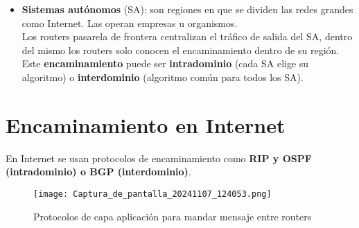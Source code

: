 \documentclass{article}
\begin{document}
\begin{itemize}
    \item \textbf{Sistemas autónomos} (SA): son regiones en que se dividen las redes grandes como Internet. Las operan empresas u organismos. \\
    Los routers pasarela de frontera centralizan el tráfico de salida del SA, dentro del mismo los routers solo conocen el encaminamiento dentro de su región. Este \textbf{encaminamiento} puede ser \textbf{intradominio} (cada SA elige su algoritmo) o \textbf{interdominio} (algoritmo común para todos los SA).
    
\end{itemize}

\newpage

\section{Encaminamiento en Internet}
En Internet se usan protocolos de encaminamiento como \textbf{RIP y OSPF (intradominio) o BGP (interdominio)}. 

\begin{figure}[h]
    \centering
    \texttt{[image: Captura\_de\_pantalla\_20241107\_124053.png]}
    \caption{Protocolos de capa aplicación para mandar mensaje entre routers}
    \label{fig:etiqueta}
\end{figure}
\end{document}
